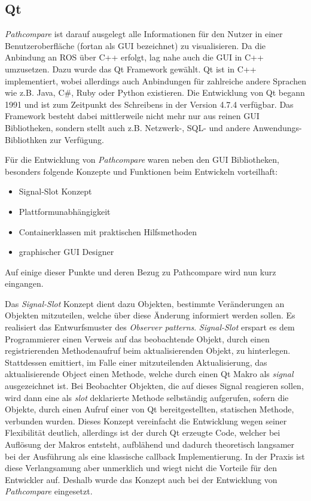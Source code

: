 \subsection{Qt}

\textit{Pathcompare} ist darauf ausgelegt alle Informationen für den Nutzer in
einer Benutzeroberfläche (fortan als GUI bezeichnet) zu visualisieren.
Da die Anbindung an \gls{ROS} über C++ erfolgt, lag nahe auch die GUI in C++
umzusetzen. Dazu wurde das Qt Framework gewählt. Qt ist in C++ implementiert, wobei
allerdings auch Anbindungen für zahlreiche andere Sprachen wie z.B.
Java, C\#, Ruby oder Python existieren. Die Entwicklung von Qt begann 1991 und
ist zum Zeitpunkt des Schreibens in der Version 4.7.4 verfügbar. Das Framework besteht dabei
mittlerweile nicht mehr nur aus reinen GUI Bibliotheken, sondern stellt auch
z.B. Netzwerk-, SQL- und andere Anwendungs-Bibliothken zur Verfügung.

Für die Entwicklung von \textit{Pathcompare} waren neben den GUI Bibliotheken,
besonders folgende Konzepte und Funktionen beim Entwickeln vorteilhaft: 

\begin{itemize}
  \item Signal-Slot Konzept
  \item Plattformunabhängigkeit
  \item Containerklassen mit praktischen Hilfsmethoden
  \item graphischer GUI Designer 
\end{itemize}

Auf einige dieser Punkte und deren Bezug zu Pathcompare wird nun kurz eingangen.

Das \textit{Signal-Slot} Konzept dient dazu Objekten, bestimmte Veränderungen an Objekten
mitzuteilen, welche über diese Änderung informiert werden sollen.
Es realisiert das Entwurfsmuster des \textit{Observer patterns}. 
\textit{Signal-Slot} erspart es dem Programmierer einen Verweis auf das beobachtende
Objekt, durch einen registrierenden Methodenaufruf beim aktualisierenden
Objekt, zu hinterlegen. Stattdessen emittiert, im Falle einer mitzuteilenden
Aktualisierung, das aktualisierende Object einen Methode, welche durch
einen Qt Makro als \textit{signal} ausgezeichnet ist. Bei Beobachter Objekten,
die auf dieses Signal reagieren sollen, wird dann eine als \textit{slot}
deklarierte Methode selbständig aufgerufen, sofern die Objekte, durch einen
Aufruf einer von Qt bereitgestellten, statischen Methode, verbunden wurden. 
Dieses Konzept vereinfacht die Entwicklung wegen seiner Flexibilität deutlich, allerdings ist der durch
Qt erzeugte Code, welcher bei Auflösung der Makros entsteht, aufblähend und
dadurch theoretisch langsamer bei der Ausführung als eine klassische callback Implementierung.
In der Praxis ist diese Verlangsamung aber unmerklich und wiegt nicht die
Vorteile für den Entwickler auf. Deshalb wurde das Konzept auch bei der Entwicklung von
\textit{Pathcompare} eingesetzt. 

